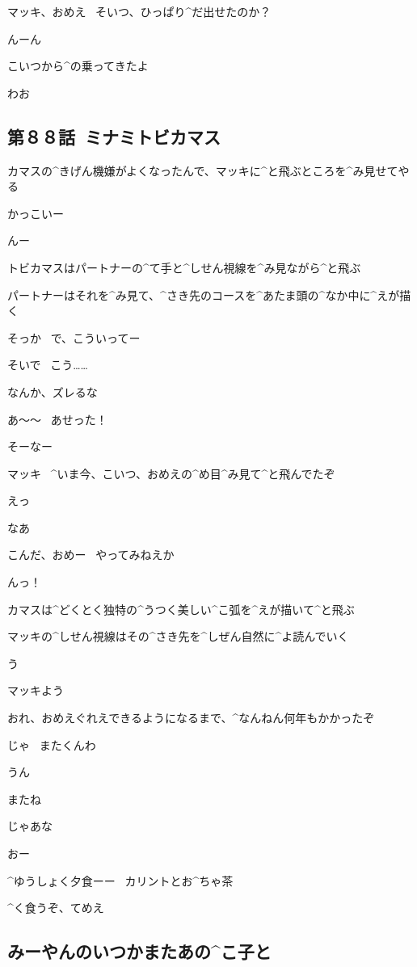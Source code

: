 \page
\Y マッキ、おめえ
\ そいつ、ひっぱり^{だ}{出}せたのか？

\M んーん

\M こいつから^{の}{乗}ってきたよ

\page
\M わお


\subsection{第８８話\ ミナミトビカマス}

\page[154]
\Y カマスの^{きげん}{機嫌}がよくなったんで、マッキに^{と}{飛}ぶところを^{み}{見}せてやる

\M かっこいー

\Y んー

\page
\Y トビカマスはパートナーの^{て}{手}と^{しせん}{視線}を^{み}{見}ながら^{と}{飛}ぶ

\Y パートナーはそれを^{み}{見}て、^{さき}{先}のコースを^{あたま}{頭}の^{なか}{中}に^{えが}{描}く

\M そっか
\ で、こういってー

\Y そいで
\ こう……

\Y なんか、ズレるな

\page[157]
\M あ〜〜
\ あせった！

\Y そーなー

\Y マッキ
\ ^{いま}{今}、こいつ、おめえの^{め}{目}^{み}{見}て^{と}{飛}んでたぞ

\M えっ

\Y なあ

\Y こんだ、おめー
\ やってみねえか

\page
\M んっ！

\page
\Y カマスは^{どくとく}{独特}の^{うつく}{美}しい^{こ}{弧}を^{えが}{描}いて^{と}{飛}ぶ

\Y マッキの^{しせん}{視線}はその^{さき}{先}を^{しぜん}{自然}に^{よ}{読}んでいく

\page
\M う

\Y マッキよう

\Y おれ、おめえぐれえできるようになるまで、^{なんねん}{何年}もかかったぞ

\page
\Y じゃ
\ またくんわ

\M うん

\page
\M またね

\Y じゃあな

\M おー

\page[164]
\Y ^{ゆうしょく}{夕食}ーー
\ カリントとお^{ちゃ}{茶}

\Y ^{く}{食}うぞ、てめえ


\subsection{みーやんのいつかまたあの^{こ}{子}と}
